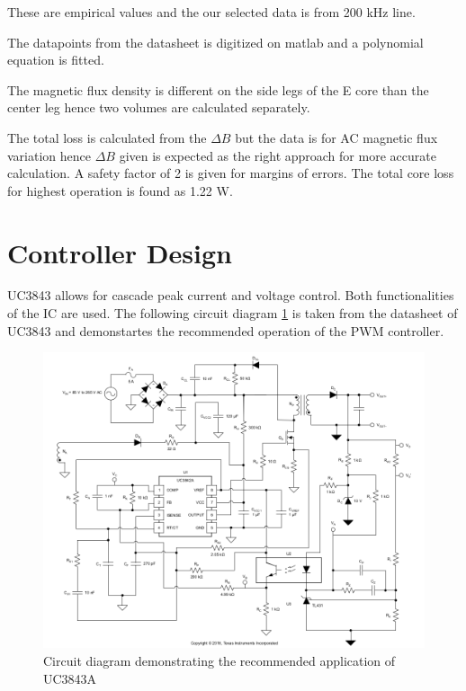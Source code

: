 \documentclass[12pt]{article}
\begin{document}
    These are empirical values and the our selected data is from 200 kHz line.

    The datapoints from the datasheet is digitized on matlab and a polynomial equation is fitted. 

    The magnetic flux density is different on the side legs of the E core than the center leg hence two volumes are calculated separately. 

    The total loss is calculated from the $\Delta B $ but the data is for AC magnetic flux variation hence $\Delta B $ given is expected as the right approach for more accurate calculation. A safety factor of 2 is given for margins of errors. The total core loss for highest operation is found as 1.22 W.



    
\newpage
\section{Controller Design}
    UC3843 allows for cascade peak current and voltage control. Both functionalities of the IC are used. The following circuit diagram \ref{fig:datasheet_circuit} is taken from the datasheet of UC3843 \cite{ic} and demonstartes the recommended operation of the PWM controller. 
    
    \begin{figure}[H]
        \centering
        \includegraphics[width = \textwidth]{img/circuit_datasheet.png}
        \caption{Circuit diagram demonstrating the recommended application of UC3843A \cite{ic}}
        \label{fig:datasheet_circuit}
    \end{figure}
    
\end{document}
